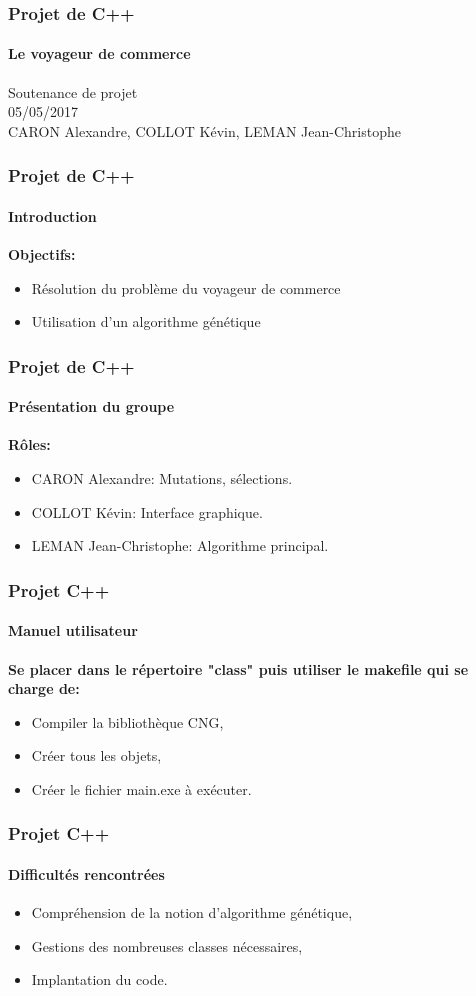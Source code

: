 \documentclass{beamer}
\begin{document}
	\begin{frame}
	\frametitle{Projet de C++}
	\framesubtitle{Le voyageur de commerce}
		\begin{center}
			Soutenance de projet\\
			05/05/2017\\
			CARON Alexandre, COLLOT Kévin, LEMAN Jean-Christophe
		\end{center}	
	\end{frame}

	\begin{frame}
	\frametitle{Projet de C++}
	\framesubtitle{Introduction}
		\textbf{Objectifs:}
		\begin{itemize}
		\item Résolution du problème du voyageur de commerce
		\item Utilisation d'un algorithme génétique
		\end{itemize}
	\end{frame}

	\begin{frame}
	\frametitle{Projet de C++}
	\framesubtitle{Présentation du groupe}
		\textbf{Rôles:}	
		\begin{itemize}
		\item CARON Alexandre: Mutations, sélections.
		\item COLLOT Kévin: Interface graphique.
		\item LEMAN Jean-Christophe: Algorithme principal.
		\end{itemize}
	\end{frame}
	
	\begin{frame}
	\frametitle{Projet C++}
	\framesubtitle{Manuel utilisateur}
		\textbf{Se placer dans le répertoire "class" puis utiliser le makefile qui se charge de:}
		\begin{itemize}
		\item Compiler la bibliothèque CNG,
		\item Créer tous les objets,
		\item Créer le fichier main.exe à exécuter.
		\end{itemize}
	\end{frame}

	\begin{frame}
	\frametitle{Projet C++}
	\framesubtitle{Difficultés rencontrées}	
		\begin{itemize}
		\item Compréhension de la notion d'algorithme génétique,
		\item Gestions des nombreuses classes nécessaires,
		\item Implantation du code.
		\end{itemize}
	\end{frame}
	
\end{document}
